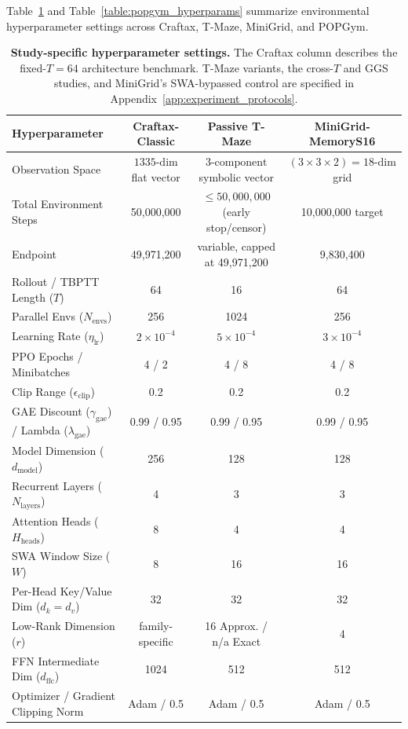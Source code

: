 Table~\ref{table:app_hyperparams} and Table~\ref{table:popgym_hyperparams} summarize environmental hyperparameter settings across Craftax, T-Maze, MiniGrid, and POPGym.

\begin{table}[ht]
\centering\small
\caption{\textbf{Study-specific hyperparameter settings.} The Craftax column describes the fixed-$T=64$ architecture benchmark. T-Maze variants, the cross-$T$ and GGS studies, and MiniGrid's SWA-bypassed control are specified in Appendix~\ref{app:experiment_protocols}.}
\label{table:app_hyperparams}
\begin{tabular}{lccc}
\toprule
\textbf{Hyperparameter} & \textbf{Craftax-Classic} & \textbf{Passive T-Maze} & \textbf{MiniGrid-MemoryS16} \\
\midrule
Observation Space & $1335\text{-dim}$ flat vector & $3\text{-component}$ symbolic vector & $(3 \times 3 \times 2) = 18\text{-dim}$ grid \\
Total Environment Steps & 50,000,000 & $\leq 50,000,000$ (early stop/censor) & 10,000,000 target \\
Endpoint & 49,971,200 & variable, capped at 49,971,200 & 9,830,400 \\
Rollout / TBPTT Length ($T$) & 64 & 16 & 64 \\
Parallel Envs ($N_{\text{envs}}$) & 256 & 1024 & 256 \\
Learning Rate ($\eta_{\mathrm{lr}}$) & $2 \times 10^{-4}$ & $5 \times 10^{-4}$ & $3 \times 10^{-4}$ \\
PPO Epochs / Minibatches & 4 / 2 & 4 / 8 & 4 / 8 \\
Clip Range ($\epsilon_{\text{clip}}$) & 0.2 & 0.2 & 0.2 \\
GAE Discount ($\gamma_{\text{gae}}$) / Lambda ($\lambda_{\text{gae}}$) & 0.99 / 0.95 & 0.99 / 0.95 & 0.99 / 0.95 \\
Model Dimension ($d_{\text{model}}$) & 256 & 128 & 128 \\
Recurrent Layers ($N_{\text{layers}}$) & 4 & 3 & 3 \\
Attention Heads ($H_{\text{heads}}$) & 8 & 4 & 4 \\
SWA Window Size ($W$) & 8 & 16 & 16 \\
Per-Head Key/Value Dim ($d_k = d_v$) & 32 & 32 & 32 \\
Low-Rank Dimension ($r$) & family-specific & 16 Approx. / n/a Exact & 4 \\
FFN Intermediate Dim ($d_{\text{ffc}}$) & 1024 & 512 & 512 \\
Optimizer / Gradient Clipping Norm & Adam / 0.5 & Adam / 0.5 & Adam / 0.5 \\
\bottomrule
\end{tabular}
\end{table}

